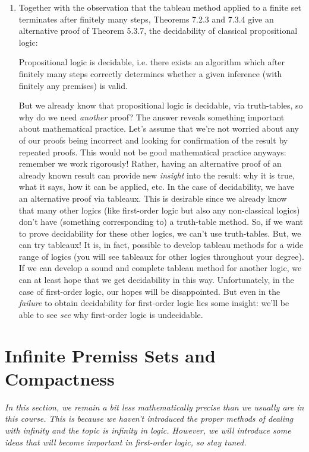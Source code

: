 \begin{enumerate}[\thesection.1]
	\item Together with the observation that the tableau method applied to a finite set terminates after finitely many steps, Theorems 7.2.3 and 7.3.4 give an alternative proof of Theorem 5.3.7, the decidability of classical propositional logic:
	\begin{theorem}
	Propositional logic is decidable, i.e. there exists an algorithm which after finitely many steps correctly determines whether a given inference (with finitely any premises) is valid.
	\end{theorem}
	But we already know that propositional logic is decidable, via truth-tables, so why do we need \emph{another} proof? The answer reveals something important about mathematical practice. Let's assume that we're not worried about any of our proofs being incorrect and looking for confirmation of the result by repeated proofs. This would not be good mathematical practice anyways: remember we work rigorously! Rather, having an alternative proof of an already known result can provide new \emph{insight} into the result: why it is true, what it says, how it can be applied, etc. In the case of decidability, we have an alternative proof via tableaux. This is desirable since we already know that many other logics (like first-order logic but also any non-classical logics) don't have (something corresponding to) a truth-table method. So, if we want to prove decidability for these other logics, we can't use truth-tables. But, we can try tableaux! It is, in fact, possible to develop tableau methods for a wide range of logics (you will see tableaux for other logics throughout your degree). If we can develop a sound and complete tableau method for another logic, we can at least hope that we get decidability in this way. Unfortunately, in the case of first-order logic, our hopes will be disappointed. But even in the \emph{failure} to obtain decidability for first-order logic lies some insight: we'll be able to see \emph{see} why first-order logic is undecidable.		
	
\end{enumerate}
		
\section{Infinite Premiss Sets and Compactness}

\emph{In this section, we remain a bit less mathematically precise than we usually are in this course. This is because we haven't introduced the proper methods of dealing with infinity and the topic is infinity in logic. However, we will introduce some ideas that will become important in first-order logic, so stay tuned.}

